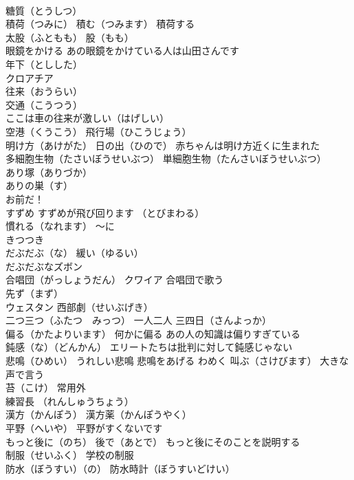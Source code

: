 \documentclass[8pt]{extreport}
\begin{document}
\begin{CJK}{UTF8}{min}
\\	糖質（とうしつ）
\\	積荷（つみに） 積む（つみます） 積荷する
\\	太股（ふともも） 股（もも）
\\	眼鏡をかける あの眼鏡をかけている人は山田さんです
\\	年下（としした）
\\	クロアチア
\\	往来（おうらい） 
\\	交通（こうつう） 
\\	ここは車の往来が激しい（はげしい）
\\	空港（くうこう） 飛行場（ひこうじょう）
\\	明け方（あけがた） 日の出（ひので） 赤ちゃんは明け方近くに生まれた
\\	多細胞生物（たさいぼうせいぶつ） 単細胞生物（たんさいぼうせいぶつ）
\\	あり塚（ありづか） 
\\	ありの巣（す） 
\\	お前だ！
\\	すずめ すずめが飛び回ります （とびまわる）
\\	慣れる（なれます） ～に
\\	きつつき
\\	だぶだぶ（な） 緩い（ゆるい） 
\\	だぶだぶなズボン
\\	合唱団（がっしょうだん） クワイア 合唱団で歌う
\\	先ず（まず）
\\	ウェスタン 西部劇（せいぶげき）
\\	二つ三つ（ふたつ　みっつ） 一人二人 三四日（さんよっか）
\\	偏る（かたよりいます） 何かに偏る あの人の知識は偏りすぎている
\\	鈍感（な）（どんかん） エリートたちは批判に対して鈍感じゃない
\\	悲鳴（ひめい） うれしい悲鳴 悲鳴をあげる わめく 叫ぶ（さけびます） 大きな声で言う
\\	苔（こけ） 常用外
\\	練習長 （れんしゅうちょう）
\\	漢方（かんぽう） 漢方薬（かんぽうやく）
\\	平野（へいや） 平野がすくないです
\\	もっと後に（のち） 後で（あとで） もっと後にそのことを説明する
\\	制服（せいふく） 学校の制服
\\	防水（ぼうすい）（の） 防水時計（ぼうすいどけい）

\end{CJK}
\end{document}
